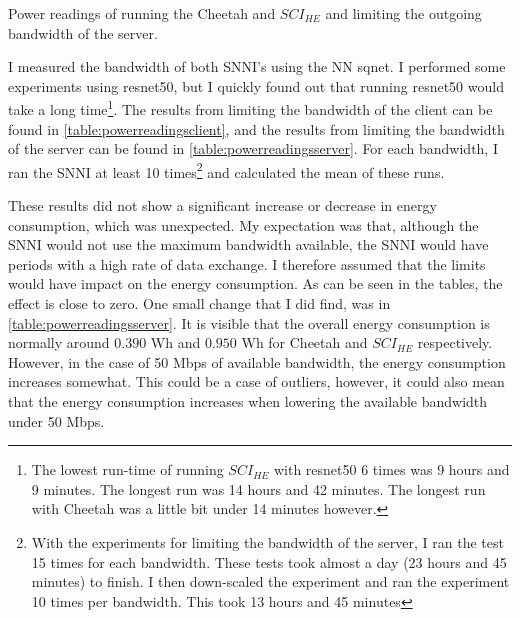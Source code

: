 \documentclass[../thesis.tex]{subfiles}
\begin{document}
\begin{table}[htbp]
    \begin{adjustbox}{width=\columnwidth,center}
        
    \end{adjustbox}
    \caption{Power readings of running the Cheetah and $SCI_{HE}$ and limiting the outgoing bandwidth of the server.}
    \label{table:powerreadingsserver}
\end{table}

I measured the bandwidth of both SNNI's using the NN sqnet. I performed some experiments using resnet50, but I quickly found out that running resnet50 would take a long time\footnote{The lowest run-time of running $SCI_{HE}$ with resnet50 6 times was 9 hours and 9 minutes. The longest run was 14 hours and 42 minutes. The longest run with Cheetah was a little bit under 14 minutes however.}. The results from limiting the bandwidth of the client can be found in \autoref{table:powerreadingsclient}, and the results from limiting the bandwidth of the server can be found in \autoref{table:powerreadingsserver}. For each bandwidth, I ran the SNNI at least 10 times\footnote{With the experiments for limiting the bandwidth of the server, I ran the test 15 times for each bandwidth. These tests took almost a day (23 hours and 45 minutes) to finish. I then down-scaled the experiment and ran the experiment 10 times per bandwidth. This took 13 hours and 45 minutes} and calculated the mean of these runs. 

These results did not show a significant increase or decrease in energy consumption, which was unexpected. My expectation was that, although the SNNI would not use the maximum bandwidth available, the SNNI would have periods with a high rate of data exchange. I therefore assumed that the limits would have impact on the energy consumption. As can be seen in the tables, the effect is close to zero. One small change that I did find, was in \autoref{table:powerreadingsserver}. It is visible that the overall energy consumption is normally around $0.390$ Wh and $0.950$ Wh for Cheetah and $SCI_{HE}$ respectively. However, in the case of 50 Mbps of available bandwidth, the energy consumption increases somewhat. This could be a case of outliers, however, it could also mean that the energy consumption increases when lowering the available bandwidth under 50 Mbps. 

\begin{figure}[hbt]
    \begin{floatrow}
        }{
            \caption{Average run-time for both Cheetah and $SCI_{HE}$.}
            \label{fig:graph_times_mean}
        }
        \ffigbox[0.5\textwidth]{\texttt{[image: \{Thesis/Images/graph\_times\_avg.png]}}}{
            \caption{Median run-time for both Cheetah and $SCI_{HE}$.}
            \label{fig:graph_times_median}
        }
    \end{floatrow}
\end{figure}
\end{document}
